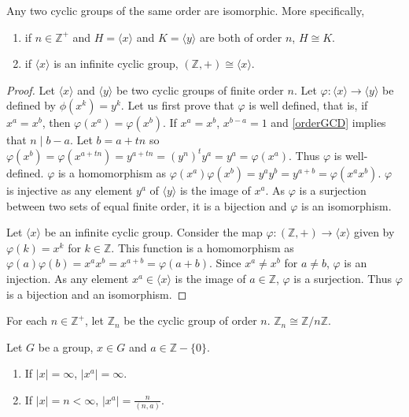 \begin{theorem}
\label{cyclicOfSameOrderAreIso}
    Any two cyclic groups of the same order are isomorphic. More specifically,
    \begin{enumerate}
        \item if $n\in\mathbb{Z}^+$ and $H=\langle x\rangle$ and $K=\langle y\rangle$ are both of order $n$, $H\cong K$.
        \item if $\langle x\rangle$ is an infinite cyclic group, $(\mathbb{Z},+)\cong\langle x\rangle$.
    \end{enumerate}
\end{theorem}
\begin{proof}
Let $\langle x\rangle$ and $\langle y\rangle$ be two cyclic groups of finite order $n$. Let $\varphi:\langle x\rangle\to\langle y\rangle$ be defined by $\phi(x^k)=y^k$. Let us first prove that $\varphi$ is well defined, that is, if $x^a=x^b$, then $\varphi(x^a)=\varphi(x^b)$. If $x^a=x^b$, $x^{b-a}=1$ and \ref{orderGCD} implies that $n\mid b-a$. Let $b=a+tn$ so
$\varphi(x^b)=\varphi(x^{a+tn})=y^{a+tn}=(y^n)^ty^a=y^a=\varphi(x^a)$. Thus $\varphi$ is well-defined. $\varphi$ is a homomorphism as $\varphi(x^a)\varphi(x^b)=y^ay^b=y^{a+b}=\varphi(x^ax^b)$. $\varphi$ is injective as any element $y^a$ of $\langle y\rangle$ is the image of $x^a$. As $\varphi$ is a surjection between two sets of equal finite order, it is a bijection and $\varphi$ is an isomorphism.

\vspace{2mm}
Let $\langle x\rangle$ be an infinite cyclic group. Consider the map $\varphi:(\mathbb{Z},+)\to\langle x\rangle$ given by $\varphi(k)=x^k$ for $k\in\mathbb{Z}$. This function is a homomorphism as $\varphi(a)\varphi(b)=x^ax^b=x^{a+b}=\varphi(a+b)$. Since $x^a\neq x^b$ for $a\neq b$, $\varphi$ is an injection. As any element $x^a\in\langle x\rangle$ is the image of $a\in\mathbb{Z}$, $\varphi$ is a surjection. Thus $\varphi$ is a bijection and an isomorphism.
\end{proof}

For each $n\in\mathbb{Z}^+$, let $\mathbb{Z}_n$ be the cyclic group of order $n$. $\mathbb{Z}_n\cong\mathbb{Z}/n\mathbb{Z}$.

\begin{theorem}
\label{orderIsOrderByGCD}
    Let $G$ be a group, $x\in G$ and $a\in\mathbb{Z}-\{0\}$.
    \begin{enumerate}
        \item If $|x|=\infty$, $|x^a|=\infty$.
        \item If $|x|=n<\infty$, $|x^a|=\frac{n}{(n,a)}$.
    \end{enumerate}
\end{theorem}

